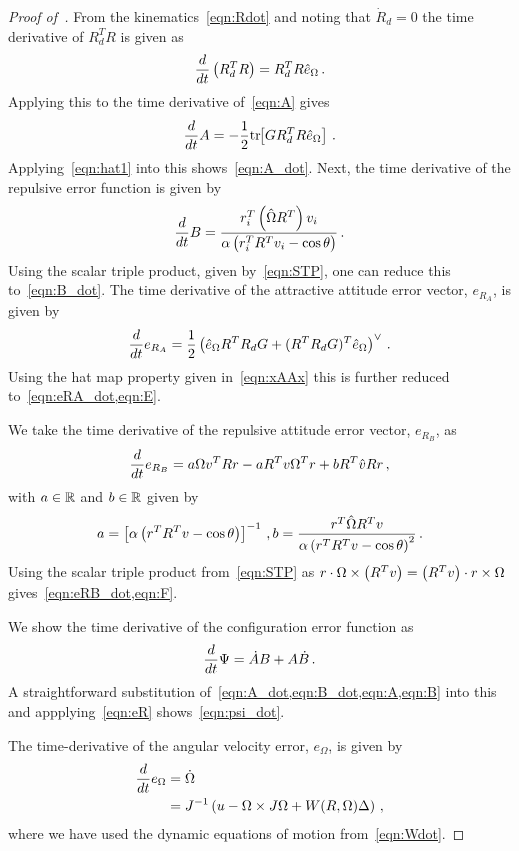 \documentclass[letterpaper, 10 pt, conference]{ieeeconf}  %
\begin{document}
\begin{proof}[Proof of~]\label{proof:error_dyn}
From the kinematics~\cref{eqn:Rdot} and noting that \( \dot{R}_d = 0 \) the time derivative of \( R_d^T R \) is given as
\begin{gather*}
	\frac{d }{d t} \left( R_d^T R \right) = R_d^T R \hat{e}_\Omega \, .
\end{gather*}
Applying this to the time derivative of~\cref{eqn:A} gives
\begin{gather*}
	\frac{d }{d t} A = -\frac{1}{2} \mathrm{tr}\negthickspace\left[ G R_d^T R \hat{e}_\Omega \right] \, .
\end{gather*}
Applying~\cref{eqn:hat1} into this shows~\cref{eqn:A_dot}.
Next, the time derivative of the repulsive error function is given by
\begin{gather*}
	\frac{d }{d t} B = \frac{r_i^T \left( \hat{\Omega} R^T \right) v_i}{\alpha \left( r_i^T R^T v_i - \cos \theta \right)} \, .
\end{gather*}
Using the scalar triple product, given by~\cref{eqn:STP}, one can reduce this to~\cref{eqn:B_dot}.
The time derivative of the attractive attitude error vector, \( e_{R_A} \), is given by
\begin{gather*}
	\frac{d }{d t} e_{R_A} = \frac{1}{2} \left( \hat{e}_\Omega R^T R_d G + (R^T R_d G)^T \hat{e}_\Omega \right)^\vee \, .
\end{gather*}
Using the hat map property given in~\cref{eqn:xAAx} this is further reduced to~\cref{eqn:eRA_dot,eqn:E}.

We take the time derivative of the repulsive attitude error vector, \( e_{R_B} \), as
\begin{gather*}
	\frac{d }{d t} e_{R_B} = a \Omega v^T R r - a R^T v \Omega^T r + b R^T \hat{v} R r \, ,
\end{gather*}
with \( a \in \mathbb{R} \) and \( b \in \mathbb{R}\) given by 
\begin{gather*}
	a = \left[ \alpha \left( r^T R^T v - \cos \theta \right) \right]^{-1} \, ,
	b = \frac{r^T \hat{\Omega} R^T v}{\alpha \left( r^T R^T v - \cos \theta \right)^2} \, .
\end{gather*}
Using the scalar triple product from~\cref{eqn:STP} as \( r \cdot \Omega \times \left( R^T v \right) = \left( R^T v \right) \cdot r \times \Omega \) gives~\cref{eqn:eRB_dot,eqn:F}.

We show the time derivative of the configuration error function as
\begin{gather*}
	\frac{d }{d t} \Psi = \dot{A} B + A \dot{B} \, .
\end{gather*}
A straightforward substitution of~\cref{eqn:A_dot,eqn:B_dot,eqn:A,eqn:B} into this and appplying~\cref{eqn:eR} shows~\cref{eqn:psi_dot}.

The time-derivative of the angular velocity error, \( e_\Omega \), is given by
\begin{align*}
	\frac{d }{d t} e_\Omega &= \dot{\Omega} \\
	&= J^{-1} \left( u - \Omega \times J \Omega + W(R,\Omega) \Delta  \right) \, ,
\end{align*}
where we have used the dynamic equations of motion from~\cref{eqn:Wdot}. 
\end{proof}
\end{document}
